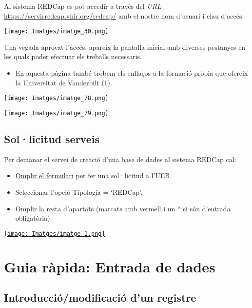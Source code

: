 \documentclass[
]{article}
\providecommand{\tightlist}{%
  \setlength{\itemsep}{0pt}\setlength{\parskip}{0pt}}
\begin{document}
Al sistema REDCap es pot accedir a través del \emph{URL} \url{https://servirredcap.vhir.org/redcap/} amb el nostre nom d'usuari i clau d'accés.

\href{https://servirredcap.vhir.org/redcap/}{\texttt{[image: Imatges/imatge\_30.png]}}

Una vegada aprovat l'accés, apareix la pantalla inicial amb diverses pestanyes en les quals poder efectuar els treballs necessaris.

\begin{itemize}
\tightlist
\item
  En aquesta pàgina també trobem els enllaços a la formació pròpia que ofereix la Universitat de Vanderbilt (1).
\end{itemize}

\texttt{[image: Imatges/imatge\_78.png]}

\texttt{[image: Imatges/imatge\_79.png]}

\hypertarget{sollicitud-serveis}{%
\subsection{\texorpdfstring{\textbf{Sol·licitud serveis}}{Sol·licitud serveis}}\label{sollicitud-serveis}}

Per demanar el servei de creació d'una base de dades al sistema REDCap cal:

\begin{itemize}
\tightlist
\item
  \href{http://www.vhir.org/portal1/webUEB/Alta.aspx}{Omplir el formulari} per fer una sol·licitud a l'UEB.
\item
  Seleccionar l'opció Tipologia = `REDCap'.
\item
  Omplir la resta d'apartats (marcats amb vermell i un * si són d'entrada obligatòria).
\end{itemize}

\href{http://www.vhir.org/portal1/webUEB/Alta.aspx}{\texttt{[image: Imatges/imatge\_1.png]}}

\hypertarget{guia-ruxe0pida-entrada-de-dades}{%
\section{\texorpdfstring{\textbf{Guia ràpida: Entrada de dades}}{Guia ràpida: Entrada de dades}}\label{guia-ruxe0pida-entrada-de-dades}}

\hypertarget{introducciuxf3modificaciuxf3-dun-registre}{%
\subsection{\texorpdfstring{\textbf{Introducció/modificació d'un registre}}{Introducció/modificació d'un registre}}\label{introducciuxf3modificaciuxf3-dun-registre}}
\end{document}
